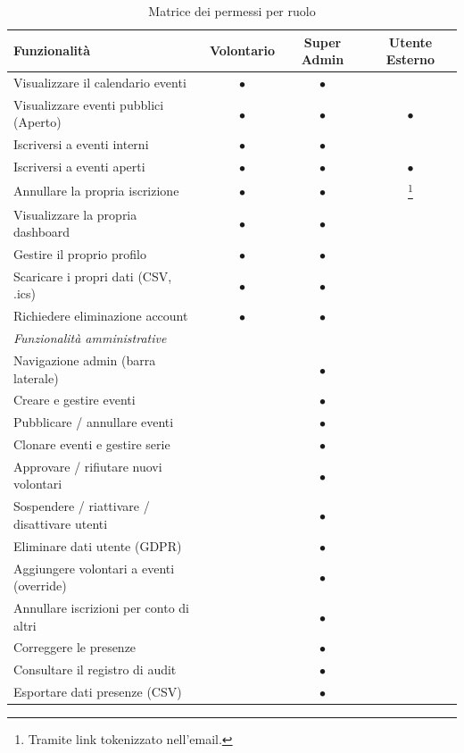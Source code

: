 \documentclass[a4paper,11pt,oneside]{book}
\begin{document}
\begin{table}[htbp]
\centering
\caption{Matrice dei permessi per ruolo}
\label{tab:matrice-permessi}
\begin{tabularx}{\textwidth}{X c c c}
\toprule
\textbf{Funzionalit\`a} & \textbf{Volontario} & \textbf{Super Admin} & \textbf{Utente Esterno} \\
\midrule
Visualizzare il calendario eventi       & $\bullet$ & $\bullet$ &            \\
Visualizzare eventi pubblici (Aperto)   & $\bullet$ & $\bullet$ & $\bullet$  \\
Iscriversi a eventi interni             & $\bullet$ & $\bullet$ &            \\
Iscriversi a eventi aperti              & $\bullet$ & $\bullet$ & $\bullet$  \\
Annullare la propria iscrizione         & $\bullet$ & $\bullet$ &\footnote{Tramite link tokenizzato nell'email.}\\
Visualizzare la propria dashboard       & $\bullet$ & $\bullet$ &            \\
Gestire il proprio profilo              & $\bullet$ & $\bullet$ &            \\
Scaricare i propri dati (CSV, .ics)     & $\bullet$ & $\bullet$ &            \\
Richiedere eliminazione account         & $\bullet$ & $\bullet$ &            \\
\midrule
\textit{Funzionalit\`a amministrative} & & & \\
\midrule
Navigazione admin (barra laterale)      &           & $\bullet$ &            \\
Creare e gestire eventi                 &           & $\bullet$ &            \\
Pubblicare / annullare eventi           &           & $\bullet$ &            \\
Clonare eventi e gestire serie          &           & $\bullet$ &            \\
Approvare / rifiutare nuovi volontari   &           & $\bullet$ &            \\
Sospendere / riattivare / disattivare utenti & & $\bullet$ &            \\
Eliminare dati utente (GDPR)            &           & $\bullet$ &            \\
Aggiungere volontari a eventi (override)&           & $\bullet$ &            \\
Annullare iscrizioni per conto di altri &           & $\bullet$ &            \\
Correggere le presenze                  &           & $\bullet$ &            \\
Consultare il registro di audit         &           & $\bullet$ &            \\
Esportare dati presenze (CSV)           &           & $\bullet$ &            \\
\bottomrule
\end{tabularx}
\end{table}
\end{document}
